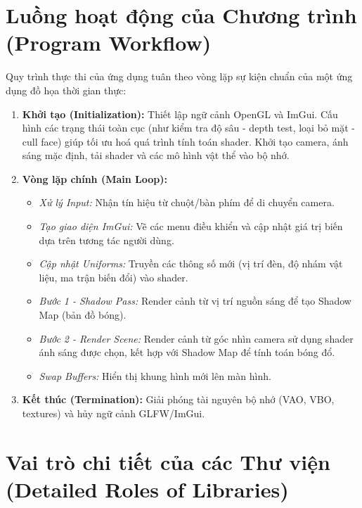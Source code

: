 \section{Luồng hoạt động của Chương trình (Program Workflow)}

Quy trình thực thi của ứng dụng tuân theo vòng lặp sự kiện chuẩn của một ứng dụng đồ họa thời gian thực:

\begin{enumerate}
	\item \textbf{Khởi tạo (Initialization):} 
	Thiết lập ngữ cảnh OpenGL và ImGui. Cấu hình các trạng thái toàn cục (như kiểm tra độ sâu - depth test, loại bỏ mặt - cull face) giúp tối ưu hoá quá trình tính toán shader. Khởi tạo camera, ánh sáng mặc định, tải shader và các mô hình vật thể vào bộ nhớ.
	
	\item \textbf{Vòng lặp chính (Main Loop):}
	\begin{itemize}
		\item \textit{Xử lý Input:} Nhận tín hiệu từ chuột/bàn phím để di chuyển camera.
		
		\item \textit{Tạo giao diện ImGui:} Vẽ các menu điều khiển và cập nhật giá trị biến dựa trên tương tác người dùng.
		
		\item \textit{Cập nhật Uniforms:} Truyền các thông số mới (vị trí đèn, độ nhám vật liệu, ma trận biến đổi) vào shader.
		
		\item \textit{Bước 1 - Shadow Pass:} Render cảnh từ vị trí nguồn sáng để tạo Shadow Map (bản đồ bóng).
		
		\item \textit{Bước 2 - Render Scene:} Render cảnh từ góc nhìn camera sử dụng shader ánh sáng được chọn, kết hợp với Shadow Map để tính toán bóng đổ.
		
		\item \textit{Swap Buffers:} Hiển thị khung hình mới lên màn hình.
	\end{itemize}
	
	\item \textbf{Kết thúc (Termination):} Giải phóng tài nguyên bộ nhớ (VAO, VBO, textures) và hủy ngữ cảnh GLFW/ImGui.
\end{enumerate}

\section{Vai trò chi tiết của các Thư viện (Detailed Roles of Libraries)}

